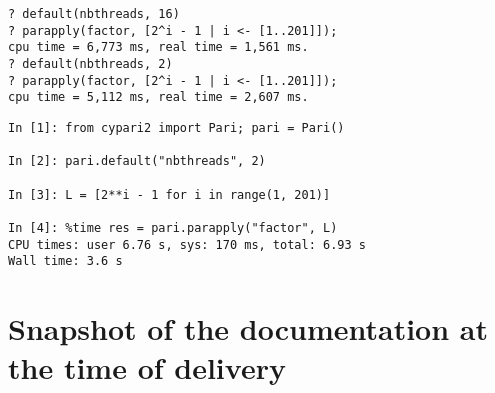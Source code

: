 \documentclass{deliverablereport}
\begin{document}
\begin{verbatim}
? default(nbthreads, 16)
? parapply(factor, [2^i - 1 | i <- [1..201]]);
cpu time = 6,773 ms, real time = 1,561 ms.
? default(nbthreads, 2)
? parapply(factor, [2^i - 1 | i <- [1..201]]);
cpu time = 5,112 ms, real time = 2,607 ms.
\end{verbatim}

\begin{verbatim}
In [1]: from cypari2 import Pari; pari = Pari()

In [2]: pari.default("nbthreads", 2)

In [3]: L = [2**i - 1 for i in range(1, 201)]

In [4]: %time res = pari.parapply("factor", L)
CPU times: user 6.76 s, sys: 170 ms, total: 6.93 s
Wall time: 3.6 s
\end{verbatim}

\appendix

\section{Snapshot of the documentation at the time of delivery}


\end{document}
